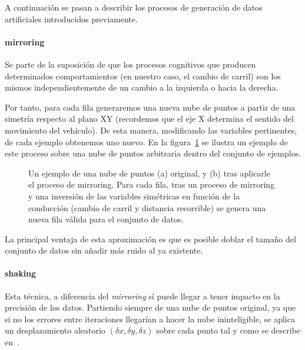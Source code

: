A continuación se pasan a describir los procesos de generación de datos artificiales introducidos previamente.

\paragraph{mirroring}

Se parte de la suposición de que los procesos cognitivos que producen determinados comportamientos (en nuestro caso, el cambio de carril) son los mismos independientemente de un cambio a la izquierda o hacia la derecha.

Por tanto, para cada fila generaremos una nueva nube de puntos a partir de una simetría respecto al plano XY (recordemos que el eje X determina el sentido del movimiento del vehículo). De esta manera, modificando las variables pertinentes, de cada ejemplo obtenemos uno nuevo. En la figura~\ref{fig:mirroring-example} se ilustra un ejemplo de este proceso sobre una nube de puntos arbitraria dentro del conjunto de ejemplos.

\begin{figure}
	\centering
	\qquad
	\caption[Ejemplo de la técnica de \textit{mirroring}]{Un ejemplo de una nube de puntos (a) original, y (b) tras aplicarle el proceso de mirroring. Para cada fila, tras un proceso de mirroring y una inversión de las variables simétricas en función de la conducción (cambio de carril y distancia recorrible) se genera una nueva fila válida para el conjunto de datos.}
	\label{fig:mirroring-example}
\end{figure}

La principal ventaja de esta aproximación es que es posible doblar el tamaño del conjunto de datos sin añadir más ruido al ya existente.

\paragraph{shaking}

Esta técnica, a diferencia del \textit{mirroring} sí puede llegar a tener impacto en la precisión de los datos. Partiendo siempre de una nube de puntos original, ya que si no los errores entre iteraciones llegarían a hacer la nube ininteligible, se aplica un desplazamiento aleatorio $(\delta x, \delta y, \delta z)$ sobre cada punto tal y como se describe en~\cite{diaz2018modelling}.

